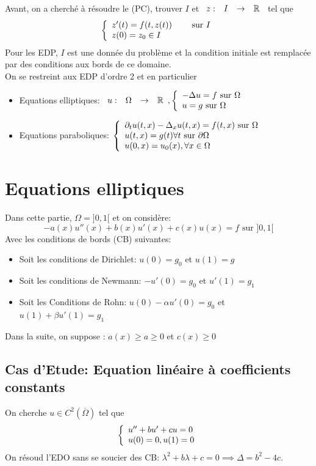 \documentclass[]{report}
\begin{document}
    Avant, on a cherché à résoudre le (PC), trouver $I$ et $\begin{array}{ccccc} z : & I & \to & \mathbb{R} \end{array}$ tel que
    \[\left\{\begin{array}{ll} z'(t)=f(t,z(t))\qquad \text{ sur $I$}\\z(0)=z_0\in I \end{array} \right.\]
    Pour les EDP, $I$ est une donnée du problème et la condition initiale est remplacée par des conditions aux bords de ce domaine.\\
    On se restreint aux EDP d'ordre 2 et en particulier
    \begin{itemize}
        \item Equations elliptiques: $\begin{array}{ccccc} u : & \Omega & \to & \mathbb{R} \end{array},\left\{\begin{array}{ll} -\Delta u=f\text{ sur $\Omega$}\\u=g\text{ sur $\Omega$} \end{array} \right.$
        \item Equations paraboliques: $\left\{\begin{array}{ll} \partial_t u(t,x)-\Delta_x u(t,x)=f(t,x)\text{ sur $\Omega$}\\u(t,x)=g(t)\forall t \text{ sur $\partial \Omega$}\\ u(0,x)=u_0(x),\forall x\in \Omega \end{array} \right.$
    \end{itemize}

    \section{Equations elliptiques}

    Dans cette partie, $\Omega =]0,1[$ et on considère:
    \[-a(x)u''(x)+b(x)u'(x)+c(x)u(x)=f\text{ sur $]0,1[$}\]
    Avec les conditions de bords (CB) suivantes:
    \begin{itemize}
        \item Soit les conditions de Dirichlet: $u(0)=g_0$ et $u(1)=g$
        \item Soit les conditions de Newmann: $-u'(0)=g_0$ et $u'(1)=g_1$
        \item Soit les Conditions de Rohn: $u(0)-\alpha u'(0)=g_0$ et $u(1)+\beta u'(1)=g_1$
    \end{itemize}
    Dans la suite, on suppose :
    $a(x)\ge a\ge 0$ et $c(x)\ge 0$
    
    \subsection{Cas d'Etude: Equation linéaire à coefficients constants}

    On cherche $u\in C^2(\overline{\Omega})$ tel que
    \[\left\{\begin{array}{ll} u''+bu'+cu=0\\ u(0)=0,u(1)=0 \end{array} \right.\]
    On résoud l'EDO sans se soucier des CB: $\lambda^2+b\lambda+c=0\implies \Delta=b^2-4c$.
\end{document}
